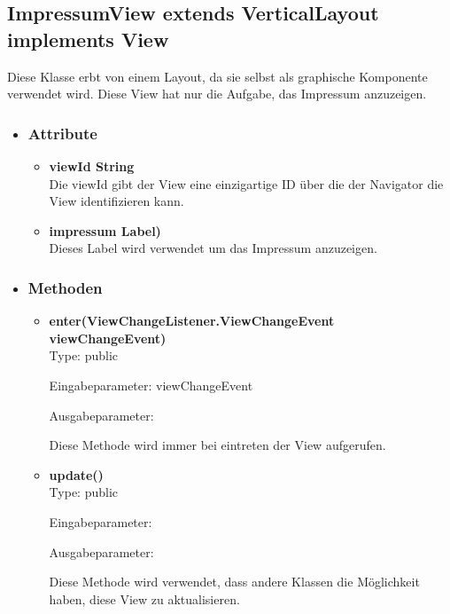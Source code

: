 \newpage
\subsection{ImpressumView extends VerticalLayout implements View}
Diese Klasse erbt von einem Layout, da sie selbst als graphische Komponente verwendet wird. Diese View hat nur die Aufgabe, das Impressum anzuzeigen.

\begin{itemize}
\item \subsubsection{Attribute}
\begin{itemize}
\item \textbf{viewId String} \hfill\\ 
Die viewId gibt der View eine einzigartige ID über die der Navigator die View identifizieren kann.

\item \textbf{impressum Label)} \hfill\\ 
Dieses Label wird verwendet um das Impressum anzuzeigen.

\end{itemize}

\item \subsubsection{Methoden}
\begin{itemize}
\item \textbf{enter(ViewChangeListener.ViewChangeEvent viewChangeEvent)}\hfill\\
Type: public

Eingabeparameter: viewChangeEvent

Ausgabeparameter:

Diese Methode wird immer bei eintreten der View aufgerufen.



\item \textbf{update()} \hfill\\ 
Type: public

Eingabeparameter:

Ausgabeparameter:

Diese Methode wird verwendet, dass andere Klassen die Möglichkeit haben, diese View zu aktualisieren.
\end{itemize}

\end{itemize}